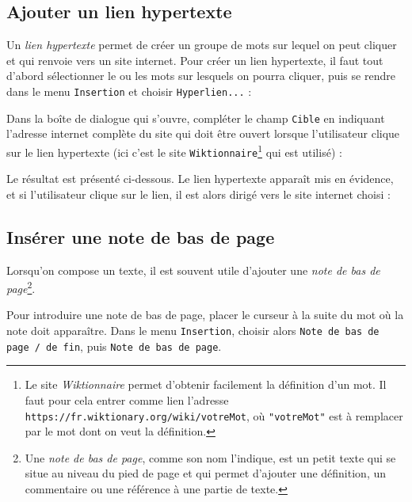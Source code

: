 \subsection{Ajouter un lien hypertexte}\label{Texte2LienHyper}

Un \emph{lien hypertexte} permet de créer un groupe de mots sur lequel on peut cliquer et qui renvoie vers un site internet. Pour créer un lien hypertexte, il faut tout d'abord sélectionner le ou les mots sur lesquels on pourra cliquer, puis se rendre dans le menu \texttt{Insertion} et choisir \texttt{Hyperlien...} :    


Dans la boîte de dialogue qui s'ouvre, compléter le champ \texttt{Cible} en indiquant l'adresse internet complète du site qui doit être ouvert lorsque l'utilisateur clique sur le lien hypertexte (ici c'est le site \texttt{Wiktionnaire}\footnote{Le site \emph{Wiktionnaire} permet d'obtenir facilement la définition d'un mot. Il faut pour cela entrer comme lien l'adresse \texttt{https://fr.wiktionary.org/wiki/votreMot}, où \texttt{"votreMot"} est à remplacer par le mot dont on veut la définition.} qui est utilisé) :   


Le résultat est présenté ci-dessous. Le lien hypertexte apparaît mis en évidence, et si l'utilisateur clique sur le lien, il est alors dirigé vers le site internet choisi :





\subsection{Insérer une note de bas de page}\label{Texte2NoteBasPage}

Lorsqu'on compose un texte, il est souvent utile d'ajouter une \emph{note de bas de page}\footnote{Une \emph{note de bas de page}, comme son nom l'indique, est un petit texte qui se situe au niveau du pied de page et qui permet d'ajouter une définition, un commentaire ou une référence à une partie de texte.}.

Pour introduire une note de bas de page, placer le curseur à la suite du mot où la note doit apparaître. Dans le menu \texttt{Insertion}, choisir alors \texttt{Note de bas de page / de fin}, puis \texttt{Note de bas de page}.       

